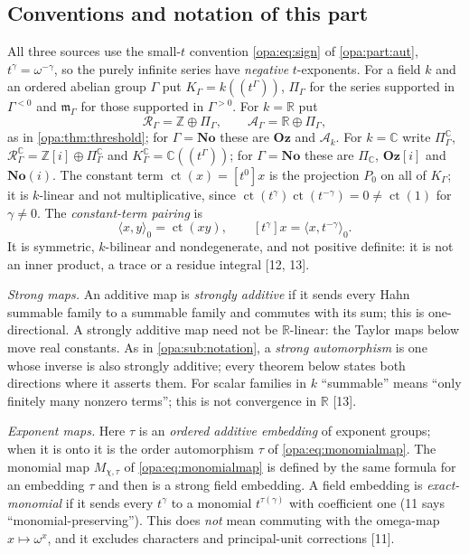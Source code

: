 \documentclass[11pt,oneside]{article}
\numberwithin{equation}{section}
\theoremstyle{definition}
\theoremstyle{remark}
\newcommand{\No}{\mathbf{No}}
\newcommand{\Oz}{\mathbf{Oz}}
\newcommand{\Og}{\mathbf{Oz}[i]}
\newcommand{\SC}{\mathbf{No}(i)}
\newcommand{\R}{\mathbb R}
\newcommand{\C}{\mathbb C}
\newcommand{\Z}{\mathbb Z}
\newcommand{\Ak}{\mathcal A_k}
\newcommand{\mm}{\mathfrak m}
\newcommand{\ct}{\operatorname{ct}}
\newcommand{\Hahn}[2]{#1((t^{#2}))}
\newcommand{\coef}[2]{[t^{#1}]#2}
\newcommand{\src}[1]{\textup{\textsf{\small[#1]}}}
\newcommand{\pairing}[2]{\langle #1,#2\rangle_0}
\begin{document}
\subsection{Conventions and notation of this part}\label{opa:as:sub:notation}

All three sources use the small-$t$ convention \eqref{opa:eq:sign} of
\cref{opa:part:aut}, $t^\gamma=\omega^{-\gamma}$, so the purely infinite series have
\emph{negative} $t$-exponents. For a field $k$ and an ordered abelian group $\Gamma$ put
$K_\Gamma=\Hahn k\Gamma$, $\Pi_\Gamma$ for the series supported in $\Gamma^{<0}$ and
$\mm_\Gamma$ for those supported in $\Gamma^{>0}$. For $k=\R$ put
\[
 \mathcal R_\Gamma=\Z\oplus\Pi_\Gamma,\qquad \mathcal A_\Gamma=\R\oplus\Pi_\Gamma,
\]
as in \cref{opa:thm:threshold}; for $\Gamma=\No$ these are $\Oz$ and $\Ak$. For $k=\C$
write $\Pi^\C_\Gamma$, $\mathcal R^\C_\Gamma=\Z[i]\oplus\Pi^\C_\Gamma$ and
$K^\C_\Gamma=\Hahn\C\Gamma$; for $\Gamma=\No$ these are $\Pi_\C$, $\Og$ and $\SC$. The
constant term $\ct(x)=\coef0x$ is the projection $P_0$ on all of $K_\Gamma$; it is
$k$-linear and not multiplicative, since $\ct(t^\gamma)\ct(t^{-\gamma})=0\ne\ct(1)$ for
$\gamma\ne0$. The \emph{constant-term pairing} is
\begin{equation}\label{opa:as:eq:pairing}
 \pairing xy=\ct(xy),\qquad \coef\gamma x=\pairing x{t^{-\gamma}} .
\end{equation}
It is symmetric, $k$-bilinear and nondegenerate, and not positive definite: it is not
an inner product, a trace or a residue integral \src{12, 13}.

\emph{Strong maps.} An additive map is \emph{strongly additive} if it sends every Hahn
summable family to a summable family and commutes with its sum; this is one-directional.
A strongly additive map need not be $\R$-linear: the Taylor maps below move real
constants. As in \cref{opa:sub:notation}, a \emph{strong automorphism} is one whose
inverse is also strongly additive; every theorem below states both directions where it
asserts them. For scalar families in $k$ ``summable'' means ``only finitely many nonzero
terms''; this is not convergence in $\R$ \src{13}.

\emph{Exponent maps.} Here $\tau$ is an \emph{ordered additive embedding} of exponent
groups; when it is onto it is the order automorphism $\tau$ of
\eqref{opa:eq:monomialmap}. The monomial map $M_{\chi,\tau}$ of
\eqref{opa:eq:monomialmap} is defined by the same formula for an embedding $\tau$ and
then is a strong field embedding. A field embedding is \emph{exact-monomial} if it sends
every $t^\gamma$ to a monomial $t^{\tau(\gamma)}$ with coefficient one (11 says
``monomial-preserving''). This does \emph{not} mean commuting with the omega-map
$x\mapsto\omega^x$, and it excludes characters and principal-unit corrections \src{11}.
\end{document}
